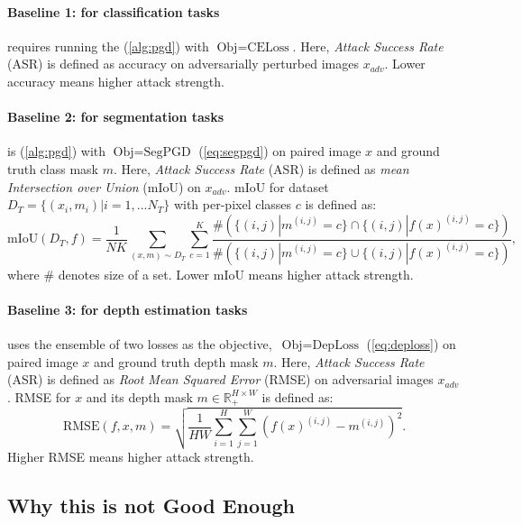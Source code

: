 \paragraph{Baseline 1: \PGD for classification tasks} requires running the \PGD (\cref{alg:pgd}) with $\text{Obj}=\text{CELoss}$. Here, \textit{Attack Success Rate} (ASR) is defined as accuracy on adversarially perturbed images $x_{adv}$. Lower accuracy means higher attack strength.

\paragraph{Baseline 2: \SegPGD for segmentation tasks} is \SegPGD (\cref{alg:pgd}) with $\text{Obj}=\text{SegPGD}$ (\cref{eq:segpgd}) on paired image $x$ and ground truth class mask $m$. Here, \textit{Attack Success Rate} (ASR) is defined as \textit{mean Intersection over Union} (mIoU) on $x_{adv}$. mIoU for dataset $D_T=\{(x_i,m_i)|i=1,...N_T\}$ with per-pixel classes $c$ is defined as:
\begin{equation}
    \text{mIoU}(D_T,f)=\frac{1}{NK}\sum_{(x,m)\sim D_T}\sum_{c=1}^{K}\frac{\#(\{(i,j)|m^{(i,j)}=c\}\cap\{(i,j)|f(x)^{(i,j)}=c\})}{\#(\{(i,j)|m^{(i,j)}=c\}\cup\{(i,j)|f(x)^{(i,j)}=c\})}\text{,}
    \label{eq:miou}
\end{equation}
where $\#$ denotes size of a set. Lower mIoU means higher attack strength.

\paragraph{Baseline 3: \DepthPGD for depth estimation tasks} uses the ensemble of two losses as the objective,~\ie $\text{Obj}=\text{DepLoss}$ (\cref{eq:deploss}) on paired image $x$ and ground truth depth mask $m$. Here, \textit{Attack Success Rate} (ASR) is defined as \textit{Root Mean Squared Error} (RMSE) on adversarial images $x_{adv}$. RMSE for $x$ and its depth mask $m\in\mathbb{R}_+^{H\times W}$ is defined as:
\begin{equation}
    \text{RMSE}(f,x,m)=\sqrt{
        \frac{1}{HW}\sum_{i=1}^{H}\sum_{j=1}^{W}(f(x)^{(i,j)}-m^{(i,j)})^2
    }\text{.}
    \label{eq:rmse}
\end{equation}
Higher RMSE means higher attack strength.

\subsection{Why this is not Good Enough}\label{sec:why_naive_advex_not_good_enough}

